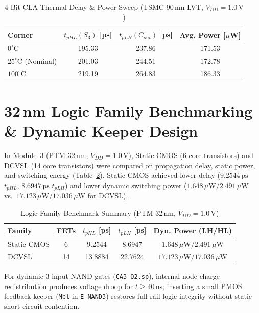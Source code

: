 \documentclass[conference]{IEEEtran}
\begin{document}
\begin{table}[htbp]
\caption{4-Bit CLA Thermal Delay \& Power Sweep (TSMC 90\,nm LVT, $V_{DD}=1.0\,\text{V}$)}
\begin{center}
\begin{tabular}{@{}lccc@{}}
\toprule
\textbf{Corner} & \textbf{$t_{pHL}(S_3)$ [ps]} & \textbf{$t_{pLH}(C_{out})$ [ps]} & \textbf{Avg. Power [$\mu$W]} \\
\midrule
$0^\circ\text{C}$ & 195.33 & 237.86 & 171.53 \\
$25^\circ\text{C}$ (Nominal) & 201.03 & 244.51 & 172.78 \\
$100^\circ\text{C}$ & 219.19 & 264.83 & 186.33 \\
\bottomrule
\end{tabular}
\label{tab:cla}
\end{center}
\end{table}

\section{32\,nm Logic Family Benchmarking \& Dynamic Keeper Design}
In Module~3 (PTM 32\,nm, $V_{DD} = 1.0\,\text{V}$), Static CMOS (6 core transistors) and DCVSL (14 core transistors) were compared on propagation delay, static power, and switching energy (Table~\ref{tab:families}). Static CMOS achieved lower delay ($9.2544\,\text{ps}$ $t_{pHL}$, $8.6947\,\text{ps}$ $t_{pLH}$) and lower dynamic switching power ($1.648\,\mu\text{W}$/$2.491\,\mu\text{W}$ vs.\ $17.123\,\mu\text{W}$/$17.036\,\mu\text{W}$ for DCVSL).

\begin{table}[htbp]
\caption{Logic Family Benchmark Summary (PTM 32\,nm, $V_{DD}=1.0\,\text{V}$)}
\begin{center}
\begin{tabular}{@{}lcccc@{}}
\toprule
\textbf{Family} & \textbf{FETs} & \textbf{$t_{pHL}$ [ps]} & \textbf{$t_{pLH}$ [ps]} & \textbf{Dyn. Power (LH/HL)} \\
\midrule
Static CMOS & 6 & 9.2544 & 8.6947 & $1.648\,\mu\text{W} / 2.491\,\mu\text{W}$ \\
DCVSL & 14 & 13.8884 & 22.7624 & $17.123\,\mu\text{W} / 17.036\,\mu\text{W}$ \\
\bottomrule
\end{tabular}
\label{tab:families}
\end{center}
\end{table}

For dynamic 3-input NAND gates (\texttt{CA3-Q2.sp}), internal node charge redistribution produces voltage droop for $t \ge 40\,\text{ns}$; inserting a small PMOS feedback keeper (\texttt{Mbl} in \texttt{E\_NAND3}) restores full-rail logic integrity without static short-circuit contention.
\end{document}

